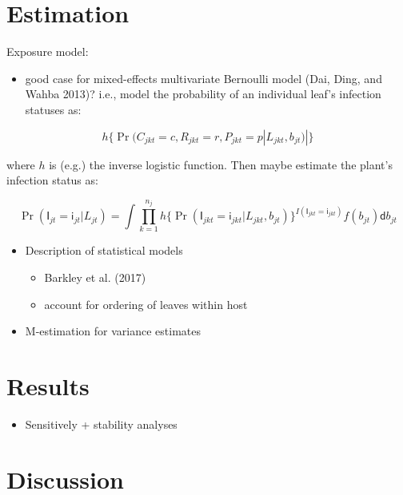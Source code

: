 \documentclass[]{article}
\providecommand{\tightlist}{%
  \setlength{\itemsep}{0pt}\setlength{\parskip}{0pt}}
\begin{document}
\hypertarget{estimation}{%
\section{Estimation}\label{estimation}}

Exposure model:

\begin{itemize}
\tightlist
\item
  good case for mixed-effects multivariate Bernoulli model (Dai, Ding,
  and Wahba 2013)? i.e., model the probability of an individual leaf's
  infection statuses as:
\end{itemize}

\[
h\{\Pr(C_{jkt} = c, R_{jkt}  = r, P_{jkt}  = p | L_{jkt}, b_{jt})|\}
\]

where \(h\) is (e.g.) the inverse logistic function. Then maybe estimate
the plant's infection status as:

\[
\Pr(\mathsf{I}_{jt} = \mathsf{i}_{jt} | L_{jt}) = \int \prod_{k = 1}^{n_j}h\{\Pr(\mathsf{I}_{jkt} = \mathsf{i}_{jkt}  | L_{jkt}, b_{jt})\}^{I(\mathsf{I}_{jkt} = \mathsf{i}_{jkt} )} f(b_{jt}) \mathsf{d}b_{jt}
\]

\begin{itemize}
\tightlist
\item
  Description of statistical models

  \begin{itemize}
  \tightlist
  \item
    Barkley et al. (2017)
  \item
    account for ordering of leaves within host
  \end{itemize}
\item
  M-estimation for variance estimates
\end{itemize}

\hypertarget{results}{%
\section{Results}\label{results}}

\begin{itemize}
\tightlist
\item
  Sensitively + stability analyses
\end{itemize}

\hypertarget{discussion}{%
\section{Discussion}\label{discussion}}
\end{document}
